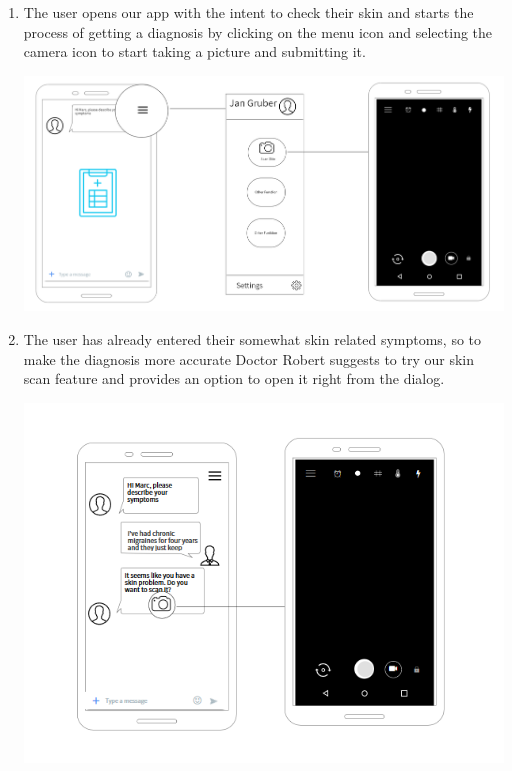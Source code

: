         \begin{enumerate}
        \item The user opens our app with the intent to check their skin and starts the process of getting a diagnosis by clicking on the menu icon and selecting the camera icon to start taking a picture and submitting it.
            
            \includegraphics[scale=0.7]{SystemSpec/Usecases/Mocks/scanskin01.png}\\
        
        \item The user has already entered their somewhat skin related symptoms, so to make the diagnosis more accurate Doctor Robert suggests to try our skin scan feature and provides an option to open it right from the dialog.
        
            \includegraphics[scale=0.7]{SystemSpec/Usecases/Mocks/scanskin02.png}\\
            
        \end{enumerate}
    
